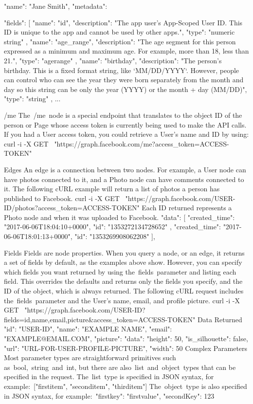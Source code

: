 {
  "name": "Jane Smith",
  "metadata": {
    "fields": [
      {
        "name": "id",
        "description": "The app user's App-Scoped User ID. This ID is unique to the app and cannot be used by other apps.",
        "type": "numeric string"
      },
      {
        "name": "age_range",
        "description": "The age segment for this person expressed as a minimum and maximum age. For example, more than 18, less than 21.",
        "type": "agerange"
      },
      {
        "name": "birthday",
        "description": "The person's birthday.  This is a fixed format string, like `MM/DD/YYYY`.  However, people can control who can see the year they were born separately from the month and day so this string can be only the year (YYYY) or the month + day (MM/DD)",
        "type": "string"
      },
...

/me
The /me node is a special endpoint that translates to the object ID of the person or Page whose access token is currently being used to make the API calls. If you had a User access token, you could retrieve a User's name and ID by using:
curl -i -X GET \
  "https://graph.facebook.com/me?access_token=ACCESS-TOKEN"

Edges
An edge is a connection between two nodes. For example, a User node can have photos connected to it, and a Photo node can have comments connected to it. The following cURL example will return a list of photos a person has published to Facebook.
curl -i -X GET \
  "https://graph.facebook.com/USER-ID/photos?access_token=ACCESS-TOKEN"
Each ID returned represents a Photo node and when it was uploaded to Facebook.
    {
  "data": [
    {
      "created_time": "2017-06-06T18:04:10+0000",
      "id": "1353272134728652"
    },
    {
      "created_time": "2017-06-06T18:01:13+0000",
      "id": "1353269908062208"
    }
  ],
}

Fields
Fields are node properties. When you query a node, or an edge, it returns a set of fields by default, as the examples above show. However, you can specify which fields you want returned by using the fields parameter and listing each field. This overrides the defaults and returns only the fields you specify, and the ID of the object, which is always returned.
The following cURL request includes the fields parameter and the User's name, email, and profile picture.
curl -i -X GET \
  "https://graph.facebook.com/USER-ID?fields=id,name,email,picture&access_token=ACCESS-TOKEN"
Data Returned
{
  "id": "USER-ID",
  "name": "EXAMPLE NAME",
  "email": "EXAMPLE@EMAIL.COM",
  "picture": {
    "data": {
      "height": 50,
      "is_silhouette": false,
      "url": "URL-FOR-USER-PROFILE-PICTURE",
      "width": 50
    }
  }
}
Complex Parameters
Most parameter types are straightforward primitives such as bool, string and int, but there are also list and object types that can be specified in the request.
The list type is specified in JSON syntax, for example: ["firstitem", "seconditem", "thirditem"]
The object type is also specified in JSON syntax, for example: {"firstkey": "firstvalue", "secondKey": 123}

}}
